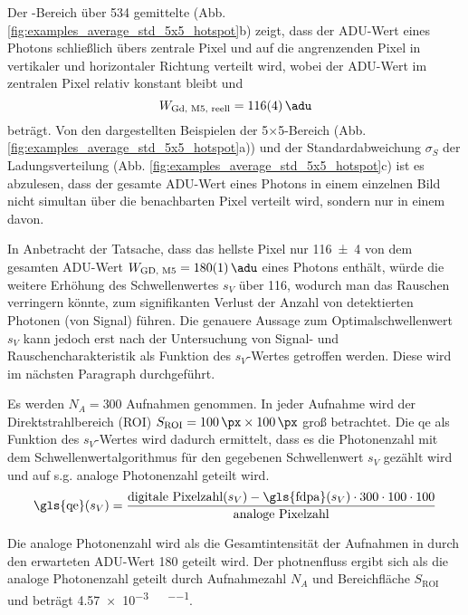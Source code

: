 \noindent
Der -Bereich über 534 gemittelte (Abb. \ref{fig:examples_average_std_5x5_hotspot}b) zeigt, dass der ADU-Wert eines Photons schließlich übers zentrale Pixel und auf die angrenzenden Pixel in vertikaler und horizontaler Richtung verteilt wird, wobei der ADU-Wert im zentralen Pixel relativ konstant bleibt und 
\begin{equation}
    W_\text{Gd, M5, reell}  = \SI{116(4)}{\adu} 
\end{equation}
beträgt. Von den dargestellten Beispielen der 5$\times$\SI{5}{\px}-Bereich (Abb. \ref{fig:examples_average_std_5x5_hotspot}a)) und der Standardabweichung $\sigma_{S}$ der Ladungsverteilung (Abb. \ref{fig:examples_average_std_5x5_hotspot}c) ist es abzulesen, dass der gesamte ADU-Wert eines Photons in einem einzelnen Bild nicht simultan über die benachbarten Pixel verteilt wird, sondern nur in einem davon. 

\noindent
In Anbetracht der Tatsache, dass das hellste Pixel nur \SI{116(4)}{\adu} von dem gesamten ADU-Wert $W_\text{GD, M5} = \SI{180(1)}{\adu}$ eines Photons enthält, würde die weitere Erhöhung des Schwellenwertes $s_V$ über \SI{116}{\adu}, wodurch man das Rauschen verringern könnte, zum signifikanten Verlust der Anzahl von detektierten Photonen (von Signal) führen. Die genauere Aussage zum Optimalschwellenwert $s_V$ kann jedoch erst nach der Untersuchung von Signal- und Rauschencharakteristik als Funktion des $s_V$-Wertes getroffen werden. Diese wird im nächsten Paragraph durchgeführt. 

\noindent
Es werden $N_A = 300$ Aufnahmen genommen. In jeder Aufnahme wird der Direktstrahlbereich (ROI) $S_\text{ROI} = \qtyproduct{100 x 100}{\px}$ groß betrachtet. Die \gls{qe} als Funktion des $s_V$-Wertes wird dadurch ermittelt, dass es die Photonenzahl mit dem Schwellenwertalgorithmus für den gegebenen Schwellenwert $s_V$ gezählt wird und auf s.g. analoge Photonenzahl geteilt wird.
\begin{equation}
    \text{\gls{qe}}(s_V) =  \frac{\text{digitale Pixelzahl}(s_V) - \text{\gls{fdpa}}(s_V)\cdot 300\cdot100\cdot 100  }{\text{analoge Pixelzahl}}
\end{equation}



Die analoge Photonenzahl wird als die Gesamtintensität der Aufnahmen in \si{\adu} durch den erwarteten ADU-Wert \SI{180}{\adu} geteilt wird. Der \gls{photnenfluss} ergibt sich als die analoge Photonenzahl geteilt durch Aufnahmezahl $N_A$ und Bereichfläche $S_\text{ROI}$ und beträgt \SI{4.57e-3}{\photons\per\pixel\per\capture}.

